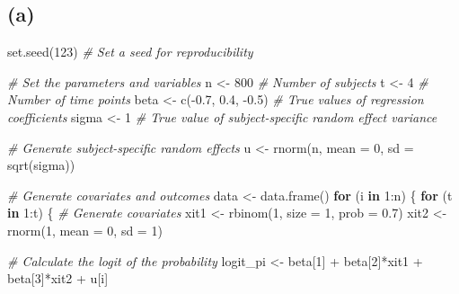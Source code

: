 \documentclass[
]{article}
\newenvironment{Shaded}{\begin{snugshade}}{\end{snugshade}}
\newcommand{\AttributeTok}[1]{\textcolor[rgb]{0.77,0.63,0.00}{#1}}
\newcommand{\CommentTok}[1]{\textcolor[rgb]{0.56,0.35,0.01}{\textit{#1}}}
\newcommand{\ControlFlowTok}[1]{\textcolor[rgb]{0.13,0.29,0.53}{\textbf{#1}}}
\newcommand{\DecValTok}[1]{\textcolor[rgb]{0.00,0.00,0.81}{#1}}
\newcommand{\FloatTok}[1]{\textcolor[rgb]{0.00,0.00,0.81}{#1}}
\newcommand{\FunctionTok}[1]{\textcolor[rgb]{0.00,0.00,0.00}{#1}}
\newcommand{\NormalTok}[1]{#1}
\newcommand{\OtherTok}[1]{\textcolor[rgb]{0.56,0.35,0.01}{#1}}
\newcommand{\SpecialCharTok}[1]{\textcolor[rgb]{0.00,0.00,0.00}{#1}}
\begin{document}
\hypertarget{a-1}{%
\subsection{(a)}\label{a-1}}

\begin{Shaded}
\begin{Highlighting}[]
\FunctionTok{set.seed}\NormalTok{(}\DecValTok{123}\NormalTok{)  }\CommentTok{\# Set a seed for reproducibility}

\CommentTok{\# Set the parameters and variables}
\NormalTok{n }\OtherTok{\textless{}{-}} \DecValTok{800}  \CommentTok{\# Number of subjects}
\NormalTok{t }\OtherTok{\textless{}{-}} \DecValTok{4}    \CommentTok{\# Number of time points}
\NormalTok{beta }\OtherTok{\textless{}{-}} \FunctionTok{c}\NormalTok{(}\SpecialCharTok{{-}}\FloatTok{0.7}\NormalTok{, }\FloatTok{0.4}\NormalTok{, }\SpecialCharTok{{-}}\FloatTok{0.5}\NormalTok{)  }\CommentTok{\# True values of regression coefficients}
\NormalTok{sigma }\OtherTok{\textless{}{-}} \DecValTok{1}  \CommentTok{\# True value of subject{-}specific random effect variance}

\CommentTok{\# Generate subject{-}specific random effects}
\NormalTok{u }\OtherTok{\textless{}{-}} \FunctionTok{rnorm}\NormalTok{(n, }\AttributeTok{mean =} \DecValTok{0}\NormalTok{, }\AttributeTok{sd =} \FunctionTok{sqrt}\NormalTok{(sigma))}

\CommentTok{\# Generate covariates and outcomes}
\NormalTok{data }\OtherTok{\textless{}{-}} \FunctionTok{data.frame}\NormalTok{()}
\ControlFlowTok{for}\NormalTok{ (i }\ControlFlowTok{in} \DecValTok{1}\SpecialCharTok{:}\NormalTok{n) \{}
  \ControlFlowTok{for}\NormalTok{ (t }\ControlFlowTok{in} \DecValTok{1}\SpecialCharTok{:}\NormalTok{t) \{}
    \CommentTok{\# Generate covariates}
\NormalTok{    xit1 }\OtherTok{\textless{}{-}} \FunctionTok{rbinom}\NormalTok{(}\DecValTok{1}\NormalTok{, }\AttributeTok{size =} \DecValTok{1}\NormalTok{, }\AttributeTok{prob =} \FloatTok{0.7}\NormalTok{)}
\NormalTok{    xit2 }\OtherTok{\textless{}{-}} \FunctionTok{rnorm}\NormalTok{(}\DecValTok{1}\NormalTok{, }\AttributeTok{mean =} \DecValTok{0}\NormalTok{, }\AttributeTok{sd =} \DecValTok{1}\NormalTok{)}
    
    \CommentTok{\# Calculate the logit of the probability}
\NormalTok{    logit\_pi }\OtherTok{\textless{}{-}}\NormalTok{ beta[}\DecValTok{1}\NormalTok{] }\SpecialCharTok{+}\NormalTok{ beta[}\DecValTok{2}\NormalTok{]}\SpecialCharTok{*}\NormalTok{xit1 }\SpecialCharTok{+}\NormalTok{ beta[}\DecValTok{3}\NormalTok{]}\SpecialCharTok{*}\NormalTok{xit2 }\SpecialCharTok{+}\NormalTok{ u[i]}
    

\end{Highlighting}
\end{Shaded}
\end{document}
